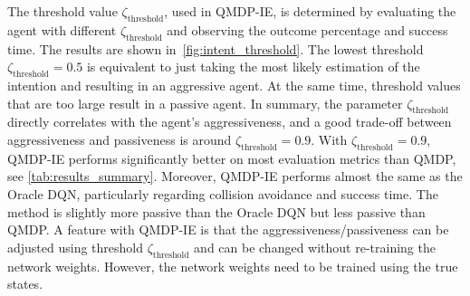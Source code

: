 The threshold value $\zeta_\text{threshold}$, used in QMDP-IE, is determined by evaluating the agent with different $\zeta_\text{threshold}$ and observing the outcome percentage and success time. The results are shown in~\ref{fig:intent_threshold}. The lowest threshold $\zeta_\text{threshold}=0.5$ is equivalent to just taking the most likely estimation of the intention and resulting in an aggressive agent. At the same time, threshold values that are too large result in a passive agent. In summary, the parameter $\zeta_\text{threshold}$ directly correlates with the agent's aggressiveness, and a good trade-off between aggressiveness and passiveness is around $\zeta_\text{threshold}=0.9$. 
With $\zeta_\text{threshold}=0.9$, QMDP-IE performs significantly better on most evaluation metrics than QMDP, see \ref{tab:results_summary}. 
Moreover, QMDP-IE performs almost the same as the Oracle DQN, particularly regarding collision avoidance and success time. The method is slightly more passive than the Oracle DQN but less passive than QMDP. A feature with QMDP-IE is that the aggressiveness/passiveness can be adjusted using threshold $\zeta_\text{threshold}$ and can be changed without re-training the network weights. However, the network weights need to be trained using the true states.  



